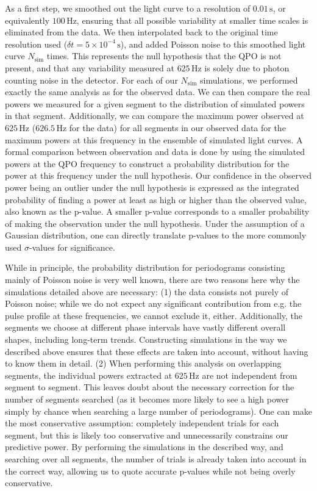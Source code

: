 \documentclass{emulateapj}
\begin{document}
As a first step, we smoothed out the light curve to a resolution of $0.01 \, \mathrm{s}$, or equivalently $100 \, \mathrm{Hz}$, ensuring that all possible variability at smaller time scales is eliminated from the data. We then interpolated back to the original time resolution used ($\delta t = 5\times10^{-4} \, \mathrm{s}$), and added Poisson noise to this smoothed light curve $N_{\mathrm{sim}}$ times. This represents the null hypothesis that the QPO is not present, and that any variability measured at $625 \, \mathrm{Hz}$ is solely due to photon counting noise in the detector. For each of our $N_{\mathrm{sim}}$ simulations, we performed exactly the same analysis as for the observed data. We can then compare the real powers we measured for a given segment to the distribution of simulated powers in that segment. Additionally, we can compare the maximum power observed at $625 \, \mathrm{Hz}$ ($626.5 \, \mathrm{Hz}$ for the \rhessi data) for all segments in our observed data for the maximum powers at this frequency in the ensemble of simulated light curves. A formal comparison between observation and data is done by using the simulated powers at the QPO frequency to construct a probability distribution for the power at this frequency under the null hypothesis. Our confidence in the observed power being an outlier under the null hypothesis is expressed as the integrated probability of finding a power at least as high or higher than the observed value, also known as the p-value. A smaller p-value corresponds to a smaller probability of making the observation under the null hypothesis. Under the assumption of a Gaussian distribution, one can directly translate p-values to the more commonly used $\sigma$-values for significance. 

While in principle, the probability distribution for periodograms consisting mainly of Poisson noise is very well known, there are two reasons here why the simulations detailed above are necessary: (1) the data consists not purely of Poisson noise; while we do not expect any significant contribution from e.g. the pulse profile at these frequencies, we cannot exclude it, either. Additionally, the segments we choose at different phase intervals have vastly different overall shapes, including long-term trends. Constructing simulations in the way we described above ensures that these effects are taken into account, without having to know them in detail. (2) When performing this analysis on overlapping segments, the individual powers extracted at $625 \, \mathrm{Hz}$ are not independent from segment to segment. This leaves doubt about the necessary correction for the number of segments searched (as it becomes more likely to see a high power simply by chance when searching a large number of periodograms). One can make the most conservative assumption: completely independent trials for each segment, but this is likely too conservative and unnecessarily constrains our predictive power. By performing the simulations in the described way, and searching over all segments, the number of trials is already taken into account in the correct way, allowing us to quote accurate p-values while not being overly conservative.
\end{document}
